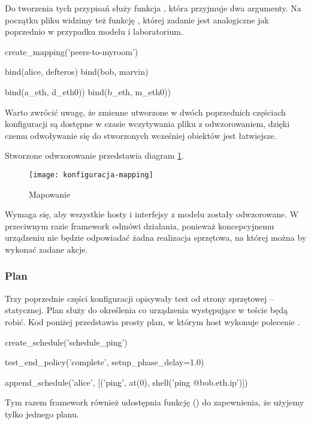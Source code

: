 \documentclass[00-praca-magisterska.tex]{subfiles}
\begin{document}
Do tworzenia tych przypisań służy funkcja , która przyjmuje dwa
argumenty. Na początku pliku widzimy też funkcję , której
zadanie jest analogiczne jak poprzednio w przypadku modelu i laboratorium.

\begin{pythoncode}
  create_mapping('peers-to-myroom')

  bind(alice, defteros)
  bind(bob,   marvin)

  bind(a_eth, d_eth0))
  bind(b_eth, m_eth0))
\end{pythoncode}

Warto zwrócić uwagę, że zmienne utworzone w dwóch poprzednich częściach
konfiguracji są dostępne w czasie wczytywania pliku z odwzorowaniem, dzięki czemu
odwoływanie się do stworzonych wcześniej obiektów jest łatwiejsze.

Stworzone odwzorowanie przedstawia diagram \ref{fig:konfiguracja-mapping}.

\begin{figure}[htb]
\begin{center}
\leavevmode
\texttt{[image: konfiguracja-mapping]}
\end{center}
\caption{Mapowanie}
\label{fig:konfiguracja-mapping}
\end{figure}

Wymaga się, aby wszystkie hosty i interfejsy z modelu zostały odwzorowane. W
przeciwnym razie framework odmówi działania, ponieważ koncepcyjnemu urządzeniu
nie będzie odpowiadać żadna realizacja sprzętowa, na której można by wykonać
zadane akcje.

\subsubsection{Plan}

Trzy poprzednie części konfiguracji opisywały test od strony sprzętowej --
statycznej. Plan służy do określenia co urządzenia występujące w teście będą
robić. Kod poniżej przedstawia prosty plan, w którym host wykonuje polecenie
.

\begin{pythoncode}
  create_schedule('schedule_ping')

  test_end_policy('complete', setup_phase_delay=1.0)

  append_schedule('alice', [('ping', at(0), shell('ping @{bob.eth.ip}')])
\end{pythoncode}

Tym razem framework również udostępnia funkcję () do
zapewnienia, że użyjemy tylko jednego planu.
\end{document}
